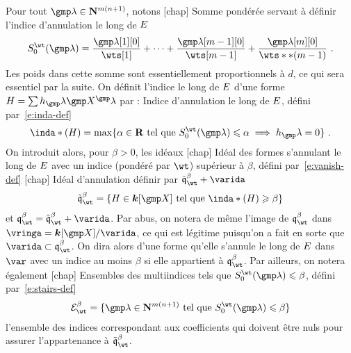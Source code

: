 Pour tout \( \imp \in \N^{\puiss(\dimp+1)} \), notons
\nomuse {\wtsum*} [chap] {Somme pondérée servant à définir l'indice
  d'annulation le long de \( E \)}
\begin{equation}
  \wtsum*( \imp )
  =
  \frac {\imp[1][0]} {\wts[1]} + \dots
  + \frac {\imp[\puiss-1][0]} {\wts[\puiss-1]}
  + \frac {\imp[\puiss][0]} {\wts**(\puiss-1)}
  \pmm.
\end{equation}
Les poids dans cette somme sont essentiellement proportionnels à \( d \), ce
qui sera essentiel par la suite.
On définit l'indice le long de \( E \) d'une forme \( H = \sum h_\imp
  \vmp^\imp \) par :
\nomuse {\inda*} {Indice d'annulation le long de \( E \), défini
  par~\eqref{e:inda-def}}
\begin{equation} \label{e:inda-def}
  \inda*(H)
  =
  \max \set{
    \alpha \in \R
    \text{ tel que }
    \wtsum*(\imp) \le \alpha \implies h_\imp = 0
  }
  \pmm.
\end{equation}
On introduit alors, pour \( \beta > 0 \), les idéaux
\nomuse {\vanish[\beta]} [chap] {Idéal des formes s'annulant le long de \(
    E \) avec un indice (pondéré par \( \wt \)) supérieur à \( \beta \),
  défini par~\eqref{e:vanish-def}}
\nomuse {\vanish*[\beta]} [chap] {Idéal d'annulation définir par \(
    \vanish*[\beta] + \varida \)}
\begin{equation} \label{e:vanish-def}
  \vanish*[\beta]
  = \left\{
    H \in \cdn [\vmp]
    \text{ tel que }
    \inda*(H) \ge \beta
  \right\}
\end{equation}
et $\vanish[\beta] = \vanish*[\beta] + \varida$. Par abus, on notera de même
l'image de \( \vanish[\beta] \) dans $\vringa = \cdn [\vmp] / \varida$, ce
qui est légitime puisqu'on a fait en sorte que $\varida \subset
\vanish[\beta]$. On dira alors d'une forme qu'elle s'annule le long de \(
  E \) dans \( \var \) avec un indice au moins \( \beta \) si elle
appartient à \( \vanish[\beta] \).  Par ailleurs, on notera également
\nomuse {\stairs[\beta]} [chap] {Ensembles des multiindices tels que \(
    \wtsum*(\imp) \le \beta \), défini par~\eqref{e:stairs-def}}
\begin{equation} \label{e:stairs-def}
  \stairs[\beta] = \set{
    \imp \in \N^{\puiss(\dimp+1)}
    \text{ tel que }
    \wtsum*(\imp) \le \beta
  }
\end{equation}
l'ensemble des indices correspondant aux coefficients qui doivent être nuls
pour assurer l'appartenance à \( \vanish*[\beta] \).

